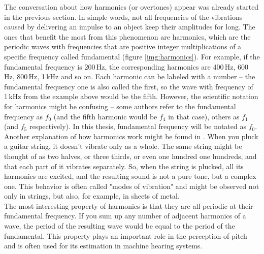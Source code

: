 The conversation about how harmonics (or overtones) appear was already started in the previous section. In simple words, not all frequencies of the vibrations caused by delivering an impulse to an object keep their amplitudes for long. The ones that benefit the most from this phenomenon are harmonics, which are the periodic waves with frequencies that are positive integer multiplications of a specific frequency called fundamental (figure \ref{img:harmonics}). For example, if the fundamental frequency is 200\,Hz, the corresponding harmonics are 400\,Hz, 600\,Hz, 800\,Hz, 1\,kHz and so on. Each harmonic can be labeled with a number -- the fundamental frequency one is also called the first, so the wave with frequency of 1\,kHz from the example above would be the fifth. However, the scientific notation for harmonics might be confusing -- some authors refer to the fundamental frequency as $f_0$ (and the fifth harmonic would be $f_4$ in that case), others as $f_1$ (and $f_5$ respectively). In this thesis, fundamental frequency will be notated as $f_0$.\\

Another explanation of how harmonics work might be found in \cite{Schnupp2011}. When you pluck a guitar string, it doesn't vibrate only as a whole. The same string might be thought of as two halves, or three thirds, or even one hundred one hundreds, and that each part of it vibrates separately. So, when the string is plucked, all its harmonics are excited, and the resulting sound is not a pure tone, but a complex one. This behavior is often called "modes of vibration" and might be observed not only in strings, but also, for example, in sheets of metal.\\

The most interesting property of harmonics is that they are all periodic at their fundamental frequency. If you sum up any number of adjacent harmonics of a wave, the period of the resulting wave would be equal to the period of the fundamental. This property plays an important role in the perception of pitch and is often used for its estimation in machine hearing systems.\\

